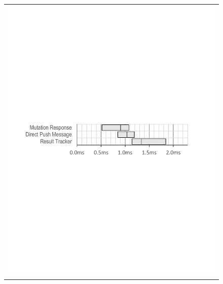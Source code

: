 \begin{figure}
\begin{tabular}{@{}c@{}}
\includegraphics[width=\columnwidth, viewport=54 354 530 444]{figs/push-latencies}\\[.2in]

\end{tabular}
\end{figure}
